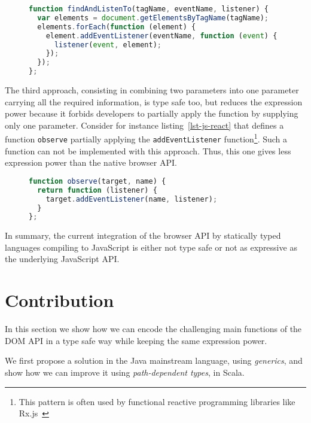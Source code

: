 \documentclass{llncs}
\newcommand{\jscode}[1]{\lstinline[language=JavaScript]|#1|}
\begin{document}
\begin{figure}
\begin{lstlisting}[label=lst-js-comb,language=JavaScript,caption={Combination of use of \jscode{getElementsByTagName} and \jscode{addEventListener}}]
function findAndListenTo(tagName, eventName, listener) {
  var elements = document.getElementsByTagName(tagName);
  elements.forEach(function (element) {
    element.addEventListener(eventName, function (event) {
      listener(event, element);
    });
  });
};
\end{lstlisting}
\end{figure}

The third approach, consisting in combining two parameters into one parameter carrying all the required information, is type safe too, but reduces the expression power because it forbids developers to partially apply the function by supplying only one parameter. Consider for instance listing~\ref{lst-js-react} that defines a function \jscode{observe} partially applying the \jscode{addEventListener} function\footnote{This pattern is often used by functional reactive programming libraries like Rx.js~\cite{liberty2011reactive}}. Such a function can not be implemented with this approach. Thus, this one gives less expression power than the native browser API.

\begin{figure}
\begin{lstlisting}[label=lst-js-react,language=JavaScript,caption={Partial application of \jscode{addEventListener} parameters}]
function observe(target, name) {
  return function (listener) {
    target.addEventListener(name, listener);
  }
};
\end{lstlisting}
\end{figure}

In summary, the current integration of the browser API by statically typed languages compiling to JavaScript is either not type safe or not as expressive as the underlying JavaScript API.

\section{Contribution}
\label{sec-contribution}

In this section we show how we can encode the challenging main functions of the DOM API in a type safe way while keeping the same expression power.

We first propose a solution in the Java mainstream language, using \emph{generics}, and show how we can improve it using \emph{path-dependent types}, in Scala.
\end{document}
